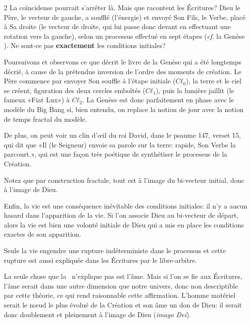 \begin{multicols}{2}
La coïncidense pourrait s'arrêter là. Mais que racontent les
Écritures? Dieu le Père, le vecteur de gauche, a soufflé (l'énergie)
et envoyé Son Fils, le Verbe, placé à Sa droite (le vecteur de
droite, qui lui passe donc devant en effectuant une rotation vers la
gauche), selon un processus effectué en sept étapes (\textit{cf}. la Genèse \cite{aelf_genese1}). Ne
sont-ce pas \textbf{exactement} les conditions initiales?

Poursuivons et observons ce que décrit le livre de la Genèse qui a été longtemps
décrié, à cause de la prétendue inversion de l'ordre des moments de création.
 Le Père commence par envoyer Son souffle à l'étape initiale
($Cℓ_0$), la terre et le ciel se créent, figuration des deux cercles
emboîtés ($Cℓ_1$), puis la lumière jaillit (le fameux «Fiat Lux») à $Cℓ_2$. La
Genèse est donc parfaitement en phase avec le modèle du Big Bang si,
bien entendu, on replace la notion de jour avec la notion de temps
fractal du modèle.

De plus, on peut voir un clin d'œil du roi David, dans le psaume 147,
verset 15, qui dit que «Il (le Seigneur) envoie sa parole sur la
terre: rapide, Son Verbe la parcourt.», \cite{aelf_psaume147} qui est une façon très poétique
de synthétiser le processus de la Création.

Notez que par construction fractale, tout est à l'image du bi-vecteur initial, donc à l'image de Dieu.

Enfin, la vie est une conséquence inévitable des conditions
initiales: il n'y a aucun hasard dans l'apparition de la vie. Si l'on associe Dieu au bi-vecteur de départ, alors la vie est bien une volonté initiale de Dieu qui a mis en place les conditions exactes de son apparition. 

Seule la vie engendre une rupture indéterministe dans le processus et cette
rupture est aussi expliquée dans les Écritures par le libre-arbitre. \cite{vatican_libre_arbitre}

La seule chose que la \PQ\ n'explique pas est l'âme. Mais si l'on se fie aux Écritures,
l'âme serait dans une autre dimension que notre univers, donc non
descriptible par cette théorie, ce qui rend raisonnable cette
affirmation. L'homme matériel serait le nœud le plus évolué de la Création et son âme un don de Dieu: il serait donc doublement et pleinement à l'image de Dieu (\textit{imago Dei}). 


\end{multicols}
